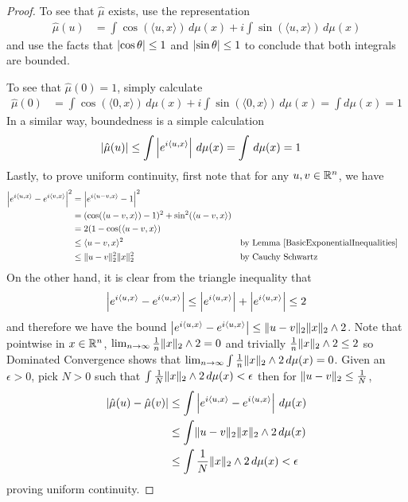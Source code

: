\begin{proof}
To see that $\hat{\mu}$ exists, use the representation
\begin{align*}
\hat{\mu}(u) &= \int \cos(\langle  u,x \rangle) \, d\mu(x)+ i \int \sin(\langle
  u,x \rangle) \, d\mu(x)
\end{align*} and use the facts that $\left \vert \cos \theta  \right \vert \leq 1$
and $\left \vert \sin \theta \right \vert \leq 1$ to conclude that both integrals are
bounded.

To see that $\hat{\mu}(0) = 1$, simply calculate
\begin{align*}
\hat{\mu}(0) &= \int \cos(\langle  0,x \rangle) \, d\mu(x)+ i \int \sin(\langle
  0,x \rangle) \, d\mu(x) = \int d\mu(x) = 1
\end{align*} 
In a similar way, boundedness is a simple calculation
\begin{align*}
\left \vert \hat{\mu}(u) \right \vert &\leq \int \left \vert e^{i \langle u,x \rangle} \right \vert \, d\mu(x) =
\int \, d\mu(x) = 1
\end{align*}
Lastly, to prove uniform continuity, first note that for any $u,v \in
\mathbb{R}^n$, we have
\begin{align*}
\left \vert e^{i \langle  u,x \rangle} - e^{i \langle  v,x \rangle}  \right \vert^2 &=
\left \vert e^{i \langle  u-v,x \rangle} - 1 \right \vert^2 \\
&= (\cos(\langle  u-v,x
\rangle) - 1)^2 + \sin^2(\langle  u-v,x \rangle) \\
&= 2(1 - \cos(\langle  u-v,x
\rangle) \\
&\leq \langle  u-v,x\rangle^2 & & \text{by Lemma
  \ref{BasicExponentialInequalities}} \\
&\leq \lVert u-v \rVert^2_2 \lVert x \rVert^2_2 & & \text{by Cauchy Schwartz}
\end{align*}
On the other hand, it is clear from the triangle inequality that
\begin{align*}
\left \vert e^{i \langle  u,x \rangle} - e^{i \langle  u,x \rangle}  \right \vert \leq
\left \vert e^{i \langle  u,x \rangle} \right \vert + \left \vert e^{i \langle  u,x \rangle}   \right \vert
\leq 2
\end{align*}
and therefore we have the bound $\left \vert e^{i \langle  u,x \rangle} -
  e^{i \langle  u,x \rangle}  \right \vert \leq \lVert u-v \rVert_2 \lVert x \rVert_2 \wedge
2$.  
Note that pointwise in $x \in \mathbb{R}^n$, $\lim_{n \to \infty}
\frac{1}{n} \lVert x \rVert_2 \wedge 2 = 0$ and trivially $\frac{1}{n}
\lVert x \rVert_2 \wedge 2 \leq 2$ so Dominated Convergence shows
that $\lim_{n \to \infty} \int \frac{1}{n} \lVert x \rVert_2 \wedge
  2 \, d\mu(x) = 0$.  Given an $\epsilon >0$, pick $N > 0$ such that
$\int \frac{1}{N} \lVert x \rVert_2 \wedge
  2 \, d\mu(x) < \epsilon$ then for  $\lVert u-v \rVert_2
\leq \frac{1}{N}$,
\begin{align*}
\left \vert \hat{\mu}(u) - \hat{\mu}(v) \right \vert &\leq \int \left \vert e^{i \langle  u,x \rangle} -
  e^{i \langle  u,x \rangle} \right \vert \, d\mu(x) \\
&\leq \int \lVert u-v \rVert_2 \lVert x \rVert_2 \wedge
2  \, d\mu(x) \\
&\leq \int \frac{1}{N} \lVert x \rVert_2 \wedge 
2  \, d\mu(x) < \epsilon
\end{align*}
proving uniform continuity.
\end{proof}
